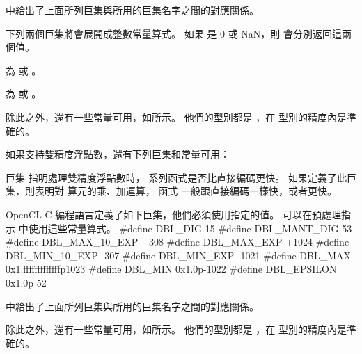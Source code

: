 中給出了上面所列巨集與所用的巨集名字之間的對應關係。

{}

下列兩個巨集將會展開成整數常量算式。
如果  是 0 或 NaN，則  會分別返回這兩個值。
\startigBase
\item {} 為  或 。
\item {} 為  或 。
\stopigBase

除此之外，還有一些常量可用，如所示。
他們的型別都是 ，在  型別的精度內是準確的。

{}

如果支持雙精度浮點數，還有下列巨集和常量可用：
\startigBase
\item 巨集  指明處理雙精度浮點數時，
  系列函式是否比直接編碼更快。
如果定義了此巨集，則表明對  算元的乘、加運算，
函式  一般跟直接編碼一樣快，或者更快。
\stopigBase

OpenCL C 編程語言定義了如下巨集，他們必須使用指定的值。
可以在預處理指示  中使用這些常量算式。
\startclc
#define DBL_DIG		15
#define DBL_MANT_DIG	53
#define DBL_MAX_10_EXP	+308
#define DBL_MAX_EXP	+1024
#define DBL_MIN_10_EXP	-307
#define DBL_MIN_EXP	-1021
#define DBL_MAX		0x1.fffffffffffffp1023
#define DBL_MIN		0x1.0p-1022
#define DBL_EPSILON	0x1.0p-52
\stopclc

中給出了上面所列巨集與所用的巨集名字之間的對應關係。

{}

除此之外，還有一些常量可用，如所示。
他們的型別都是 ，在  型別的精度內是準確的。

{}

